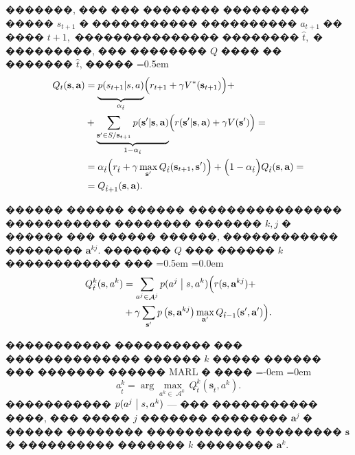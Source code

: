 \documentclass[11pt]{ubs}
\DeclareMathOperator{\action}{\mathcal{A}}
\begin{document}
�������, ��� ��� �������� ��������� ����� $s_{t+1}$ � ����������� ���������� $a_{t+1} $ �� ���� $t+1,$ ��������������� �������� ${\hat{t}},$ � ���������, ��� �������� $Q$ ���� �� ������� $\hat{t}$, �����
{\abovedisplayskip=0.5em
\begin{equation}\label{eq:iteration_formula_Q}
  \begin{split}
    Q_{t}(\textbf{s},\textbf{a}) & =  \underbrace{p(s_{t+1}| s,a)\rule[-0.8em]{0em}{2em}}_{\alpha_{\hat{t}}} \Bigl( r_{t+1} + \gamma V^*(\textbf{s}_{t+1})\Bigr)  +                                                                         \\
                                 & + \underbrace{\sum\limits_{\textbf{s}' \in S/\textbf{s}_{t+1}} p(\textbf{s}'| \textbf{s},\textbf{a}) }_{1-\alpha_{\hat{t}}}\Bigl( r(\textbf{s}'| \textbf{s},\textbf{a}) + \gamma V(\textbf{s}') \Bigr) = \\
                                 & =\alpha_{\hat{t}}\Bigl( r_{\hat{t}} + \gamma\max\limits_{\textbf{s}'}Q_{\hat{t}}(\textbf{s}_{t+1},\textbf{s}')\Bigr)  + \Bigl(1- \alpha_{\hat{t}}\Bigr) Q_{\hat{t}}(\textbf{s},\textbf{a})   =           \\
                                 & =  Q_{\hat{t}+1}(\textbf{s},\textbf{a}).
  \end{split}
\end{equation}}

������ ������ ������ ���������������� ����������� �������� ������� $k,j$ � ������ ��� ������ ������, ������������ �������� $\textbf{a}^{kj}$.  
������� $Q$ ��� ������ $k$ ������������ ���
\abovedisplayskip=0.5em
\belowdisplayskip=0.0em
\begin{equation*}
  \begin{split}
    Q_{\hat{t}}^k(\textbf{s},a^k) & = \sum\limits_{a^j \in \action^j} p(a^j \bigm| s, a^k) \Bigl(
    r(\textbf{s},\textbf{a}^{kj}) +                                                                                                                                                  \\
                                  & + \gamma\sum\limits_{\textbf{s}'}p\left(\textbf{s},\textbf{a}^{kj}\right)\max\limits_{\textbf{a}'}Q_{\hat{t}-1}(\textbf{s}',\textbf{a}') \Bigr).
  \end{split}
\end{equation*}

����������� ���������� ��� �������������� ������ $k$ ����� ������ ��� ������� ������ MARL � ���� %
{
\abovedisplayskip=-0em
\belowdisplayskip=0em
\begin{equation}\label{eq:solfor2}
  {a}^k_{\hat{t}} = \arg\max\limits_{{a}^{k} \in  \action^k} Q^k_{\hat{t}}( \textbf{s}_{\hat{t}}, {a}^{k}).
\end{equation}
}
����������� $p(a^j \bigm| s, a^k)$ --- ��� ����������� ����, ��� ����� $j$ ������� �������� $\textbf{a}^j$ � ������ �������� ����������� ��������� $\textbf{s}$ � ���������� ������� $k$ �������� $\textbf{a}^k$.
\end{document}
